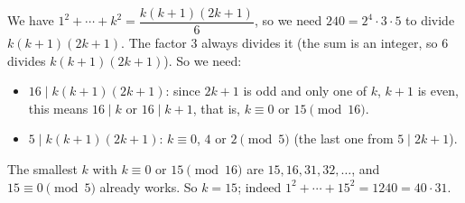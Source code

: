 We have $1^2+\cdots+k^2=\dfrac{k(k+1)(2k+1)}{6}$, so we need $240=2^4\cdot3\cdot5$ to divide $k(k+1)(2k+1)$. The factor $3$ always divides it (the sum is an integer, so $6$ divides $k(k+1)(2k+1)$). So we need:
\begin{itemize}
\item $16\mid k(k+1)(2k+1)$: since $2k+1$ is odd and only one of $k$, $k+1$ is even, this means $16\mid k$ or $16\mid k+1$, that is, $k\equiv0$ or $15\pmod{16}$.
\item $5\mid k(k+1)(2k+1)$: $k\equiv0$, $4$ or $2\pmod5$ (the last one from $5\mid2k+1$).
\end{itemize}
The smallest $k$ with $k\equiv0$ or $15\pmod{16}$ are $15, 16, 31, 32,\dots$, and $15\equiv0\pmod5$ already works. So $k=\boxed{15}$; indeed $1^2+\cdots+15^2=1240=40\cdot31$.
